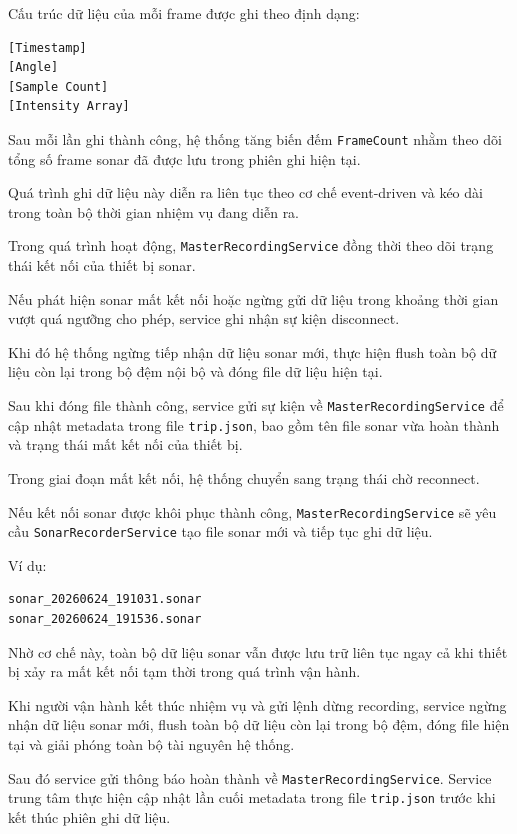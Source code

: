 \documentclass[../DoAn.tex]{subfiles}
\begin{document}
Cấu trúc dữ liệu của mỗi frame được ghi theo định dạng:

\begin{verbatim}
[Timestamp]
[Angle]
[Sample Count]
[Intensity Array]
\end{verbatim}

Sau mỗi lần ghi thành công, hệ thống tăng biến đếm \texttt{FrameCount} nhằm theo dõi tổng số frame sonar đã được lưu trong phiên ghi hiện tại.

Quá trình ghi dữ liệu này diễn ra liên tục theo cơ chế event-driven và kéo dài trong toàn bộ thời gian nhiệm vụ đang diễn ra.

Trong quá trình hoạt động, \texttt{MasterRecordingService} đồng thời theo dõi trạng thái kết nối của thiết bị sonar.

Nếu phát hiện sonar mất kết nối hoặc ngừng gửi dữ liệu trong khoảng thời gian vượt quá ngưỡng cho phép, service ghi nhận sự kiện disconnect.

Khi đó hệ thống ngừng tiếp nhận dữ liệu sonar mới, thực hiện flush toàn bộ dữ liệu còn lại trong bộ đệm nội bộ và đóng file dữ liệu hiện tại.

Sau khi đóng file thành công, service gửi sự kiện về \texttt{MasterRecordingService} để cập nhật metadata trong file \texttt{trip.json}, bao gồm tên file sonar vừa hoàn thành và trạng thái mất kết nối của thiết bị.

Trong giai đoạn mất kết nối, hệ thống chuyển sang trạng thái chờ reconnect.

Nếu kết nối sonar được khôi phục thành công, \texttt{MasterRecordingService} sẽ yêu cầu \texttt{SonarRecorderService} tạo file sonar mới và tiếp tục ghi dữ liệu.

Ví dụ:

\begin{verbatim}
sonar_20260624_191031.sonar
sonar_20260624_191536.sonar
\end{verbatim}

Nhờ cơ chế này, toàn bộ dữ liệu sonar vẫn được lưu trữ liên tục ngay cả khi thiết bị xảy ra mất kết nối tạm thời trong quá trình vận hành.

Khi người vận hành kết thúc nhiệm vụ và gửi lệnh dừng recording, service ngừng nhận dữ liệu sonar mới, flush toàn bộ dữ liệu còn lại trong bộ đệm, đóng file hiện tại và giải phóng toàn bộ tài nguyên hệ thống.

Sau đó service gửi thông báo hoàn thành về \texttt{MasterRecordingService}. Service trung tâm thực hiện cập nhật lần cuối metadata trong file \texttt{trip.json} trước khi kết thúc phiên ghi dữ liệu.
\end{document}
